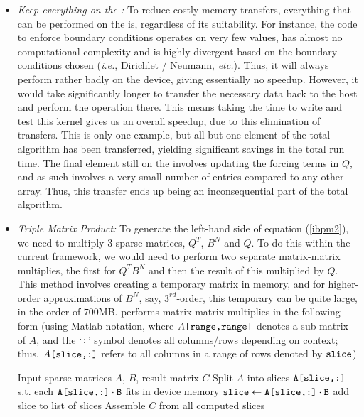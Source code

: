 \begin{itemize}

\item \emph{Keep everything on the {\gpu}: } To reduce costly memory transfers, everything that can be performed on the {\gpu} is, regardless of its suitability. For instance, the code to enforce boundary conditions operates on very few values, has almost no computational complexity and is highly divergent based on the boundary conditions chosen (\emph{i.e.}, Dirichlet / Neumann, \emph{etc.}). Thus, it will always perform rather badly on the device, giving essentially no speedup. However, it would take significantly longer to transfer the necessary data back to the host and perform the operation there. This means taking the time to write and test this kernel gives us an overall speedup, due to this elimination of transfers. This is only one example, but all but one element of the total algorithm has been transferred, yielding significant savings in the total run time. The final element still on the {\cpu} involves updating the forcing terms in $Q$, and as such involves a very small number of entries compared to any other array. Thus, this transfer ends up being an inconsequential part of the total algorithm.

\item \emph{Triple Matrix Product: } To generate the left-hand side of equation (\ref{ibpm2}), we need to multiply 3 sparse matrices, $Q^{T}$, $B^{N}$ and $Q$. To do this within the current {\cusp} framework, we would need to perform two separate matrix-matrix multiplies, the first for $Q^{T}B^{N}$ and then the result of this multiplied by $Q$. This method involves creating a temporary matrix in memory, and for higher-order approximations of $B^{N}$, say, $3^{rd}$-order, this temporary can be quite large, in the order of $700\mathrm{MB}$. {\cusp} performs matrix-matrix multiplies in the following form (using Matlab notation, where $A\verb|[range,range]|$ denotes a sub matrix of $A$, and the `$\verb|:|$' symbol denotes all columns/rows depending on context; thus, $A\verb|[slice,:]|$ refers to all columns in a range of rows denoted by $\verb|slice|$)

\begin{algorithmic}
	\REQUIRE Input sparse matrices $A$, $B$, result matrix $C$
	\STATE Split $A$ into slices $\verb|A[slice,:]|$ s.t. each $\verb|A[slice,:]|\cdot \verb|B|$ fits in device memory
		\STATE $\verb|slice| \gets \verb|A[slice,:]|\cdot \verb|B|$
		\STATE add slice to list of slices
	\ENDFOR
	\STATE Assemble $C$ from all computed slices
\end{algorithmic}


\end{itemize}

